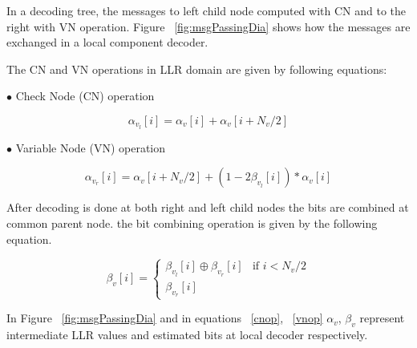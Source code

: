In a decoding  tree, the messages to left child node computed with CN and to the right with VN operation.  Figure ~\ref{fig:msgPassingDia} shows how the messages are exchanged in a local component decoder.

The CN and VN operations in LLR domain are given by following equations:

$\bullet$ Check Node (CN) operation

\begin{equation} \label{cnop}
	\alpha_{v_{l}}[i] = \alpha_{v}[i] + \alpha_{v}[i + N_{v}/2]
\end{equation}

$\bullet$ Variable Node (VN) operation

\begin{equation} \label{vnop}
\alpha_{v_{r}}[i] = \alpha_{v}[i + N_{v}/2] + (1 - 2\beta_{v_{l}}[i]) * \alpha_{v}[i]
\end{equation}

After decoding is done at both right and left child nodes the bits are combined at common parent node. the bit combining operation is given by the following equation.

\begin{equation*} \label{bitCombination}
\beta_{v}[i] = \begin{cases}
				\beta_{v_{l}}[i] \oplus \beta_{v_{r}}[i] & \text{if }i < N_{v}/2 \\
				\beta_{v_{r}}[i]
				\end{cases}
\end{equation*}

In Figure ~\ref{fig:msgPassingDia} and in equations ~\ref{cnop}, ~\ref{vnop}  $\alpha_{v}$, $\beta_{v}$ represent intermediate LLR values and estimated bits at local decoder respectively.



